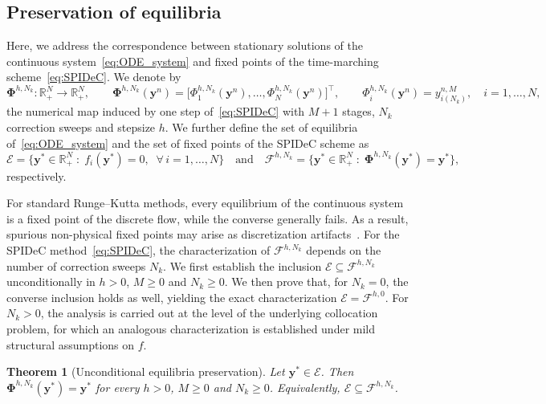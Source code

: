 \documentclass[a4paper,num-refs]{oup-contemporary-spidec}
\newtheorem{theorem}{Theorem}[section]
\begin{document}
\subsection{Preservation of equilibria}
Here, we address the correspondence between stationary solutions of the continuous system~\eqref{eq:ODE_system} and fixed points of the time-marching scheme~\eqref{eq:SPIDeC}. We denote by
\begin{equation}\label{eq:Phi}
    \bm{\Phi}^{h,N_k} : \mathbb{R}_{+}^{N} \longrightarrow \mathbb{R}_{+}^{N}, \qquad \bm{\Phi}^{h,N_k}(\bm{y}^n) = \bigl[\Phi^{h,N_k}_1(\bm{y}^n),\dots,\Phi^{h,N_k}_N(\bm{y}^n)\bigr]^\top, \qquad \Phi_i^{h,N_k}(\bm{y}^n) = y^{n,M}_{i(N_k)}, \quad i=1,\dots,N,
\end{equation}
the numerical map induced by one step of~\eqref{eq:SPIDeC} with $M+1$ stages, $N_k$ correction sweeps and stepsize $h$. We further define the set of equilibria of~\eqref{eq:ODE_system} and the set of fixed points of the SPIDeC scheme as
\begin{equation}\label{eq:Sets}
    \mathcal{E} = \bigl\{\bm{y}^*\in\mathbb{R}_{+}^{N} \;:\; f_i(\bm{y}^*)=0, \;\;\forall\, i=1,\dots,N\bigr\} \quad \text{and} \quad \mathcal{F}^{h,N_k} =\bigl\{\bm{y}^*\in\mathbb{R}_{+}^{N} \;:\; \bm{\Phi}^{h,N_k}(\bm{y}^*)=\bm{y}^*\bigr\},
\end{equation}
respectively.

For standard Runge--Kutta methods, every equilibrium of the continuous system is a fixed point of the discrete flow, while the converse generally fails. As a result, spurious non-physical fixed points may arise as discretization artifacts~\cite{Hairer_Iserles_SanzSerna_1990,Humphries_1993}. For the SPIDeC method~\eqref{eq:SPIDeC}, the characterization of $\mathcal{F}^{h,N_k}$ depends on the number of correction sweeps $N_k$. We first establish the inclusion $\mathcal{E}\subseteq\mathcal{F}^{h,N_k}$ unconditionally in $h>0$, $M\geq 0$ and $N_k\geq 0$. We then prove that, for $N_k=0$, the converse inclusion holds as well, yielding the exact characterization $\mathcal{E}=\mathcal{F}^{h,0}$. For $N_k>0$, the analysis is carried out at the level of the underlying collocation problem, for which an analogous characterization is established under mild structural assumptions on $f$.

\begin{theorem}[Unconditional equilibria preservation]
\label{thm:EqSubsetFP}
    Let $\bm{y}^*\in\mathcal{E}$. Then $\bm{\Phi}^{h,N_k}(\bm{y}^*)=\bm{y}^*$ for every $h>0$, $M\geq 0$ and $N_k\geq 0$. Equivalently, $\mathcal{E}\subseteq\mathcal{F}^{h,N_k}$.
\end{theorem}
\end{document}
